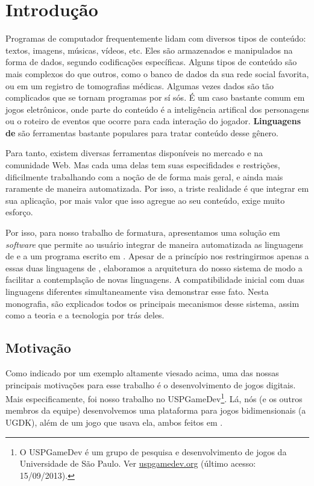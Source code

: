 
\chapter{Introdução}
\label{sec:intr}

Programas de computador frequentemente lidam com diversos tipos de conteúdo:
textos, imagens, músicas, vídeos, etc. Eles são armazenados e manipulados na
forma de dados, segundo codificações específicas. Alguns tipos de conteúdo são
mais complexos do que outros, como o banco de dados da sua rede social favorita,
ou em um registro de tomografias médicas. Algumas vezes dados são tão
complicados que se tornam programas por sí sós. É um caso bastante comum em
jogos eletrônicos, onde parte do conteúdo é a inteligência artifical dos
personagens ou o roteiro de eventos que ocorre para cada interação do jogador.
\textbf{Linguagens de \script{}} são ferramentas bastante populares para tratar
conteúdo desse gênero.

Para tanto, existem diversas ferramentas disponíveis no mercado e na comunidade
Web. Mas cada uma delas tem suas especifidades e restrições, dificilmente
trabalhando com a noção de  de forma mais geral, e ainda mais
raramente de maneira automatizada. Por isso, a triste realidade é que integrar
 em sua aplicação, por mais valor que isso agregue ao seu conteúdo,
exige muito esforço.

Por isso, para nosso trabalho de formatura, apresentamos uma solução em
\textit{software} que permite ao usuário integrar de maneira automatizada as
linguagens de \script{}  e  a um programa escrito em
\CXX{}. Apesar de a princípio nos restringirmos apenas a essas duas linguagens
de \script{}, elaboramos a arquitetura do nosso sistema de modo a facilitar
a contemplação de novas linguagens. A compatibilidade inicial com duas
linguagens diferentes simultaneamente visa demonstrar esse fato. Nesta
monografia, são explicados todos os principais mecanismos desse sistema, assim
como a teoria e a tecnologia por trás deles.

\section{Motivação}
\label{sec:intr:motivacao}

Como indicado por um exemplo altamente viesado acima, uma das nossas principais
motivações para esse trabalho é o desenvolvimento de jogos digitais. Mais
especificamente, foi nosso trabalho no USPGameDev\footnote{
  O USPGameDev é um grupo de pesquisa e desenvolvimento de jogos da
  Universidade de São Paulo. Ver \url{uspgamedev.org} (último acesso: 
  15/09/2013).
}.
Lá, nós (e os outros membros da equipe) desenvolvemos uma plataforma para jogos
bidimensionais (a UGDK\footnotemark), além de um jogo que usava ela, ambos feitos em \CXX{}.

